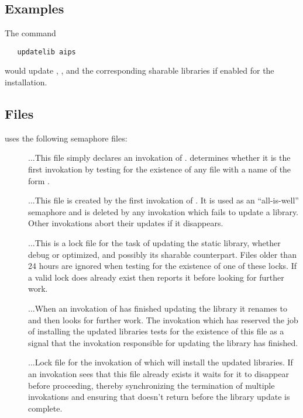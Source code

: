 \subsection*{Examples}

The command

\begin{verbatim}
   updatelib aips
\end{verbatim}

\noindent
would update , , and the
corresponding sharable libraries if enabled for the installation.

\subsection*{Files}

 uses the following semaphore files:

\begin{description}
\item[]
...This file simply declares an invokation of .
 determines whether it is the first invokation by testing for
the existence of any file with a name of the form .

\item[]
...This file is created by the first invokation of .  It is
used as an ``all-is-well'' semaphore and is deleted by any invokation which
fails to update a library.  Other invokations abort their updates if it
disappears.

\item[]
...This is a lock file for the task of updating the static library, whether
debug or optimized, and possibly its sharable counterpart.  Files older than
24 hours are ignored when testing for the existence of one of these locks.  If
a valid lock does already exist then  reports it before looking
for further work.

\item[]
...When an invokation of  has finished updating the library it
renames  to  and then looks for
further work.  The invokation which has reserved the job of installing the
updated libraries tests for the existence of this file as a signal that the
invokation responsible for updating the library has finished.

\item[]
...Lock file for the invokation of  which will install the
updated libraries.  If an invokation sees that this file already exists it
waits for it to disappear before proceeding, thereby synchronizing the
termination of multiple invokations and ensuring that  doesn't
return before the library update is complete.
\end{description}

